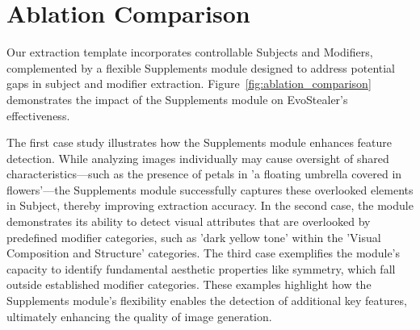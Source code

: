 \section{Ablation Comparison} \label{app_ablation}

Our extraction template incorporates controllable Subjects and Modifiers, complemented by a flexible Supplements module designed to address potential gaps in subject and modifier extraction. Figure~\ref{fig:ablation_comparison} demonstrates the impact of the Supplements module on EvoStealer's effectiveness.

The first case study illustrates how the Supplements module enhances feature detection. While analyzing images individually may cause oversight of shared characteristics—such as the presence of petals in 'a floating umbrella covered in flowers'—the Supplements module successfully captures these overlooked elements in Subject, thereby improving extraction accuracy. In the second case, the module demonstrates its ability to detect visual attributes that are overlooked by predefined modifier categories, such as 'dark yellow tone' within the 'Visual Composition and Structure' categories. The third case exemplifies the module's capacity to identify fundamental aesthetic properties like symmetry, which fall outside established modifier categories. These examples highlight how the Supplements module's flexibility enables the detection of additional key features, ultimately enhancing the quality of image generation.

